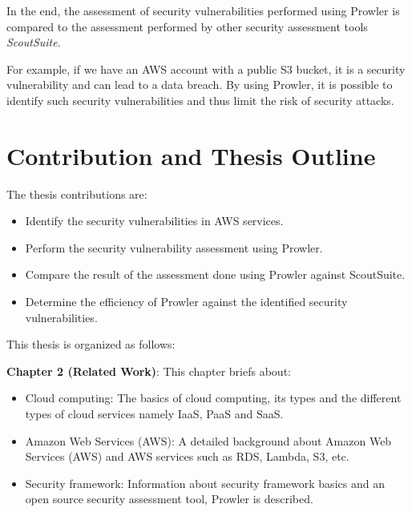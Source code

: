 \par In the end, the assessment of security vulnerabilities performed using Prowler is compared to the assessment performed by other security assessment tools \textit{ScoutSuite}.

\par For example, if we have an AWS account with a public S3 bucket, it is a security vulnerability and can lead to a data breach.
By using Prowler, it is possible to identify such security vulnerabilities and thus limit the risk of security attacks.

\section{Contribution and Thesis Outline}
\par The thesis contributions are:
\begin{itemize}
    \item Identify the security vulnerabilities in AWS services.
\end{itemize}
\begin{itemize}
    \item Perform the security vulnerability assessment using Prowler.
\end{itemize}
\begin{itemize}
    \item Compare the result of the assessment done using Prowler against ScoutSuite.
\end{itemize}
\begin{itemize}
    \item Determine the efficiency of Prowler against the identified security vulnerabilities.
\end{itemize}

\par This thesis is organized as follows:
\par \textbf{Chapter 2 (Related Work)}: This chapter briefs about:
\begin{itemize}
    \item Cloud computing: The basics of cloud computing, its types and the different types of cloud services namely IaaS, PaaS and SaaS.
\end{itemize}
\begin{itemize}
    \item Amazon Web Services (AWS): A detailed
    background about Amazon Web Services (AWS) and AWS
    services such as RDS, Lambda, S3, etc.
\end{itemize}
\begin{itemize}
    \item Security framework: Information about security framework basics and an open source security assessment tool, Prowler is described.
\end{itemize}

